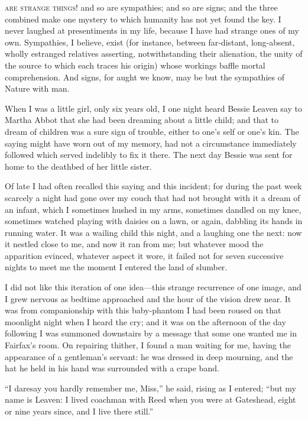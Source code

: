 
 \textsc{are strange things!} and so are sympathies; and so are
signs; and the three combined make one mystery to which humanity has not
yet found the key. I never laughed at presentiments in my life, because
I have had strange ones of my own. Sympathies, I believe, exist (for
instance, between far-distant, long-absent, wholly estranged relatives
asserting, notwithstanding their alienation, the unity of the source to
which each traces his origin) whose workings baffle mortal
comprehension. And signs, for aught we know, may be but the sympathies
of Nature with man.

When I was a little girl, only six years old, I one night heard Bessie
Leaven say to Martha Abbot that she had been dreaming about a little
child; and that to dream of children was a sure sign of trouble, either
to one's self or one's kin. The saying might have worn out of my
memory, had not a circumstance immediately followed which served
indelibly to fix it there. The next day Bessie was sent for home to the
deathbed of her little sister.

Of late I had often recalled this saying and this incident; for during
the past week scarcely a night had gone over my couch that had not
brought with it a dream of an infant, which I sometimes hushed in my
arms, sometimes dandled on my knee, sometimes watched playing with
daisies on a lawn, or again, dabbling its hands in running water. It
was a wailing child this night, and a laughing one the next: now it
nestled close to me, and now it ran from me; but whatever mood the
apparition evinced, whatever aspect it wore, it failed not for seven
successive nights to meet me the moment I entered the land of slumber.

I did not like this iteration of one idea---this strange recurrence of
one image, and I grew nervous as bedtime approached and the hour of the
vision drew near. It was from companionship with this baby-phantom I
had been roused on that moonlight night when I heard the cry; and it was
on the afternoon of the day following I was summoned downstairs by a
message that some one wanted me in \Mrs{} Fairfax's room. On repairing
thither, I found a man waiting for me, having the appearance of a
gentleman's servant: he was dressed in deep mourning, and the hat he
held in his hand was surrounded with a crape band.

\enquote{I daresay you hardly remember me, Miss,} he said, rising as I
entered; \enquote{but my name is Leaven: I lived coachman with \Mrs{} Reed
	when you were at Gateshead, eight or nine years since, and I live there
	still.}


